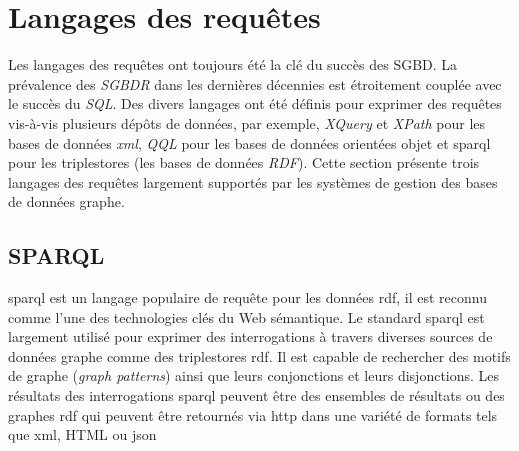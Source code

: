 

\section{Langages des requêtes}
\label{sec:query-languages}
Les langages des requêtes ont toujours été la clé du succès des
\acrshort{SGBD}. La prévalence des \emph{\acrshort{SGBDR}} dans les
dernières décennies est étroitement couplée avec le succès du
\emph{SQL}. Des divers langages ont été définis pour exprimer des
requêtes vis-à-vis plusieurs dépôts de données, par exemple,
\emph{XQuery} \cite{boag2002xquery} et \emph{XPath}
\cite{clark1999xml} pour les bases de données \emph{\acrshort{xml}},
\emph{QQL} \cite{alashqur1989oql} pour les bases de données orientées
objet et \acrshort{sparql} \cite{prud2008sparql} pour les
triplestores (les bases de données \emph{RDF}). Cette section présente
trois langages des requêtes largement supportés par les systèmes de
gestion des bases de données graphe.

% 


  \subsection{SPARQL}
  \label{sec:sparql}
  \acrshort{sparql} \cite{prud2008sparql} est un langage populaire de
  requête pour les données \acrshort{rdf}, il est reconnu comme l'une
  des technologies clés du Web sémantique. Le standard
  \acrshort{sparql} est largement utilisé pour exprimer des
  interrogations à travers diverses sources de données graphe comme
  des triplestores \acrshort{rdf}. Il est capable de rechercher des
  motifs de graphe (\emph{graph patterns}) ainsi que leurs
  conjonctions et leurs disjonctions. Les résultats des interrogations
  \acrshort{sparql} peuvent être des ensembles de résultats ou des
  graphes \acrshort{rdf} qui peuvent être retournés via
  \acrshort{http} dans une variété de formats tels que \acrshort{xml},
  HTML ou \acrshort{json}\medskip

